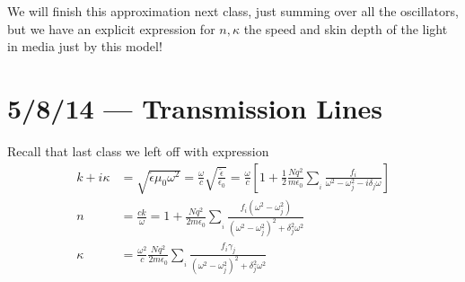 \documentclass[10pt]{report}
\begin{document}
We will finish this approximation next class, just summing over all the oscillators, but we have an explicit expression for $n,\kappa$ the speed and skin depth of the light in media just by this model!
\chapter{5/8/14 --- Transmission Lines}

Recall that last class we left off with expression
\begin{align}
    k + i\kappa &= \sqrt{\tilde{\epsilon}\mu_0 \omega^2} = \frac{\omega}{c}\sqrt{\frac{\tilde{\epsilon}}{\epsilon_0}} = \frac{\omega}{c} \left[ 1 + \frac{1}{2}\frac{Nq^2}{m\epsilon_0}\sum_{_i}^{}\frac{f_i}{\omega^2 - \omega_j^2 - i\delta_j\omega} \right]\\
    n &= \frac{ck}{\omega} = 1 + \frac{Nq^2}{2m\epsilon_0}\sum_{_i}^{}\frac{f_i(\omega^2 - \omega_j^2)}{(\omega^2 - \omega_j^2)^2 + \delta_j^2\omega^2}\\
    \kappa &= \frac{\omega^2}{c}\frac{Nq^2}{2m\epsilon_0}\sum_{_i}^{}\frac{f_i\gamma_j}{(\omega^2 - \omega_j^2)^2 + \delta_j^2\omega^2}
\end{align}
\end{document}
